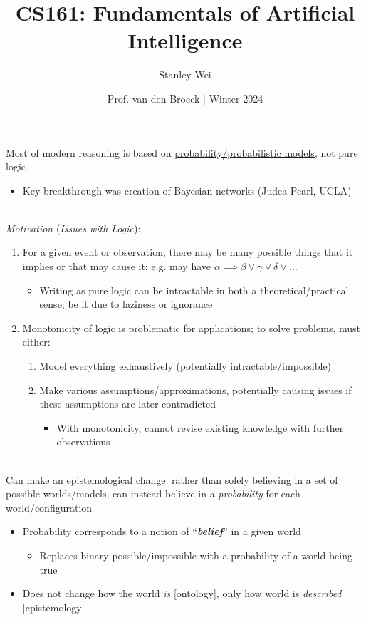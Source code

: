 \documentclass[12pt]{extarticle}
\title{CS161: Fundamentals of Artificial Intelligence}
\author{Stanley Wei}
\date{Prof. van den Broeck $\vert$ Winter 2024}
\theoremstyle{definition}
\theoremstyle{remark}
\newcommand{\pstart}[0]{\noindent}
\newcommand{\newp}[0]{~\\ \pstart}
\newcommand{\term}[1]{\noindent\textbf{\textit{#1}}}
\begin{document}
\pstart
Most of modern reasoning is based on \ul{probability/probabilistic models}, not pure logic \begin{itemize}
    \item Key breakthrough was creation of Bayesian networks (Judea Pearl, UCLA)
\end{itemize}

\newp
\textit{Motivation} (\textit{Issues with Logic}): \begin{enumerate}
    \item For a given event or observation, there may be many possible things that it implies or that may cause it; e.g. may have $\alpha\implies\beta\lor\gamma\lor\delta\lor\hdots$\begin{itemize}
        \item Writing as pure logic can be intractable in both a theoretical/practical sense, be it due to laziness or ignorance
    \end{itemize}
    \item Monotonicity of logic is problematic for applications; to solve problems, must either: \begin{enumerate}
        \item Model everything exhaustively (potentially intractable/impossible)
        \item Make various assumptions/approximations, potentially causing issues if these assumptions are later contradicted \begin{itemize}
            \item With monotonicity, cannot revise existing knowledge with further observations
        \end{itemize}
    \end{enumerate}
\end{enumerate}

\newp
Can make an epistemological change: rather than solely believing in a set of possible worlds/models, can instead believe in a \textit{probability} for each world/configuration \begin{itemize}
    \item Probability corresponds to a notion of ``\term{belief}'' in a given world \begin{itemize}
        \item Replaces binary possible/impossible with a probability of a world being true
    \end{itemize}
    \item Does not change how the world \textit{is} [ontology], only how world is \textit{described} [epistemology]
\end{itemize}
\end{document}
